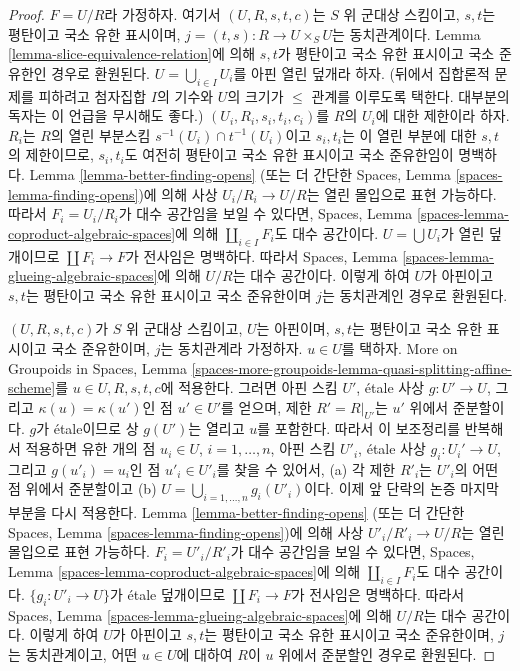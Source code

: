 \begin{proof}
\medskip\noindent
$F = U/R$라 가정하자. 여기서 $(U, R, s, t, c)$는 $S$ 위 군대상
스킴이고, $s, t$는 평탄이고 국소 유한 표시이며,
$j = (t, s) : R \to U \times_S U$는 동치관계이다.
Lemma \ref{lemma-slice-equivalence-relation}에 의해
$s, t$가 평탄이고 국소 유한 표시이고 국소 준유한인 경우로 환원된다.
$U = \bigcup_{i \in I} U_i$를 아핀 열린 덮개라 하자.
(뒤에서 집합론적 문제를 피하려고 첨자집합 $I$의 기수와 $U$의 크기가
$\leq$ 관계를 이루도록 택한다. 대부분의 독자는 이 언급을 무시해도 좋다.)
$(U_i, R_i, s_i, t_i, c_i)$를 $R$의 $U_i$에 대한 제한이라 하자.
$R_i$는 $R$의 열린 부분스킴
$s^{-1}(U_i) \cap t^{-1}(U_i)$이고 $s_i, t_i$는 이 열린 부분에 대한
$s, t$의 제한이므로, $s_i, t_i$도 여전히 평탄이고 국소 유한 표시이고
국소 준유한임이 명백하다.
Lemma \ref{lemma-better-finding-opens}
(또는 더 간단한 Spaces, Lemma \ref{spaces-lemma-finding-opens})에 의해
사상 $U_i/R_i \to U/R$는 열린 몰입으로 표현 가능하다.
따라서 $F_i = U_i/R_i$가 대수 공간임을 보일 수 있다면,
Spaces, Lemma \ref{spaces-lemma-coproduct-algebraic-spaces}에 의해
$\coprod_{i \in I} F_i$도 대수 공간이다.
$U = \bigcup U_i$가 열린 덮개이므로
$\coprod F_i \to F$가 전사임은 명백하다.
따라서 Spaces, Lemma \ref{spaces-lemma-glueing-algebraic-spaces}에 의해
$U/R$는 대수 공간이다.
이렇게 하여 $U$가 아핀이고 $s, t$는 평탄이고 국소 유한 표시이고
국소 준유한이며 $j$는 동치관계인 경우로 환원된다.

\medskip\noindent
$(U, R, s, t, c)$가 $S$ 위 군대상 스킴이고, $U$는 아핀이며,
$s, t$는 평탄이고 국소 유한 표시이고 국소 준유한이며,
$j$는 동치관계라 가정하자.
$u \in U$를 택하자. More on Groupoids in Spaces,
Lemma \ref{spaces-more-groupoids-lemma-quasi-splitting-affine-scheme}를
$u \in U, R, s, t, c$에 적용한다. 그러면 아핀 스킴 $U'$,
\'etale 사상 $g : U' \to U$, 그리고
$\kappa(u) = \kappa(u')$인 점 $u' \in U'$를 얻으며,
제한 $R' = R|_{U'}$는 $u'$ 위에서 준분할이다.
$g$가 \'etale이므로 상 $g(U')$는 열리고 $u$를 포함한다.
따라서 이 보조정리를 반복해서 적용하면 유한 개의 점
$u_i \in U$, $i = 1, \ldots, n$, 아핀 스킴 $U'_i$,
\'etale 사상 $g_i : U_i' \to U$, 그리고
$g(u'_i) = u_i$인 점 $u'_i \in U'_i$를 찾을 수 있어서,
(a) 각 제한 $R'_i$는 $U'_i$의 어떤 점 위에서 준분할이고
(b) $U = \bigcup_{i = 1, \ldots, n} g_i(U'_i)$이다.
이제 앞 단락의 논증 마지막 부분을 다시 적용한다.
Lemma \ref{lemma-better-finding-opens}
(또는 더 간단한 Spaces, Lemma \ref{spaces-lemma-finding-opens})에 의해
사상 $U'_i/R'_i \to U/R$는 열린 몰입으로 표현 가능하다.
$F_i = U'_i/R'_i$가 대수 공간임을 보일 수 있다면,
Spaces, Lemma \ref{spaces-lemma-coproduct-algebraic-spaces}에 의해
$\coprod_{i \in I} F_i$도 대수 공간이다.
$\{g_i : U'_i \to U\}$가 \'etale 덮개이므로
$\coprod F_i \to F$가 전사임은 명백하다.
따라서 Spaces, Lemma \ref{spaces-lemma-glueing-algebraic-spaces}에 의해
$U/R$는 대수 공간이다.
이렇게 하여 $U$가 아핀이고 $s, t$는 평탄이고 국소 유한 표시이고
국소 준유한이며, $j$는 동치관계이고, 어떤 $u \in U$에 대하여
$R$이 $u$ 위에서 준분할인 경우로 환원된다.


\end{proof}
